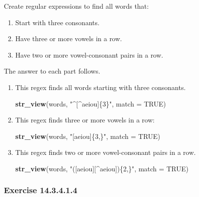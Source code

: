 \documentclass[]{book}
\newenvironment{Shaded}{\begin{snugshade}}{\end{snugshade}}
\newcommand{\DataTypeTok}[1]{\textcolor[rgb]{0.13,0.29,0.53}{#1}}
\newcommand{\KeywordTok}[1]{\textcolor[rgb]{0.13,0.29,0.53}{\textbf{#1}}}
\newcommand{\NormalTok}[1]{#1}
\newcommand{\OtherTok}[1]{\textcolor[rgb]{0.56,0.35,0.01}{#1}}
\newcommand{\StringTok}[1]{\textcolor[rgb]{0.31,0.60,0.02}{#1}}
\providecommand{\tightlist}{%
  \setlength{\itemsep}{0pt}\setlength{\parskip}{0pt}}
\theoremstyle{plain}
\theoremstyle{remark}
\begin{document}
Create regular expressions to find all words that:

\begin{enumerate}
\def\labelenumi{\arabic{enumi}.}
\tightlist
\item
  Start with three consonants.
\item
  Have three or more vowels in a row.
\item
  Have two or more vowel-consonant pairs in a row.
\end{enumerate}

The answer to each part follows.

\begin{enumerate}
\def\labelenumi{\arabic{enumi}.}
\item
  This regex finds all words starting with three consonants.

\begin{Shaded}
\begin{Highlighting}[]
\KeywordTok{str_view}\NormalTok{(words, }\StringTok{"^[^aeiou]\{3\}"}\NormalTok{, }\DataTypeTok{match =} \OtherTok{TRUE}\NormalTok{)}
\end{Highlighting}
\end{Shaded}
\item
  This regex finds three or more vowels in a row:

\begin{Shaded}
\begin{Highlighting}[]
\KeywordTok{str_view}\NormalTok{(words, }\StringTok{"[aeiou]\{3,\}"}\NormalTok{, }\DataTypeTok{match =} \OtherTok{TRUE}\NormalTok{)}
\end{Highlighting}
\end{Shaded}
\item
  This regex finds two or more vowel-consonant pairs in a row.

\begin{Shaded}
\begin{Highlighting}[]
\KeywordTok{str_view}\NormalTok{(words, }\StringTok{"([aeiou][^aeiou])\{2,\}"}\NormalTok{, }\DataTypeTok{match =} \OtherTok{TRUE}\NormalTok{)}
\end{Highlighting}
\end{Shaded}
\end{enumerate}

\hypertarget{exercise-14.3.4.1.4}{%
\subsubsection*{\texorpdfstring{Exercise {14.3.4.1.4}}{Exercise 14.3.4.1.4}}\label{exercise-14.3.4.1.4}}
\end{document}
